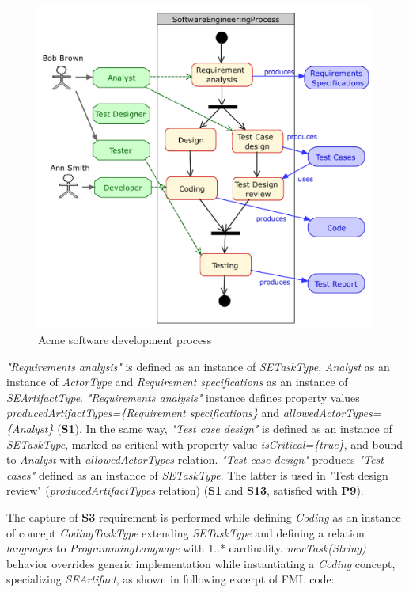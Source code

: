 \begin{figure}
 \centering
    \includegraphics[width=1.0 \columnwidth]{Figures/SoftwareEngineeringProcessCroped.pdf}
     \caption{Acme software development process}
    \label{fig:AcmeSoftwareDevelopmentProcess}
\end{figure}

\textit{"Requirements analysis"} is defined as an instance of \textit{SETaskType}, \textit{Analyst} as an instance of \textit{ActorType} and \textit{Requirement specifications} as an instance of \textit{SEArtifactType}. \textit{"Requirements analysis"} instance defines property values \textit{producedArtifactTypes=\{Requirement specifications\}} and \textit{allowedActorTypes=\{Analyst\}} (\textbf{S1}). In the same way, \textit{"Test case design"} is defined as an instance of \textit{SETaskType}, marked as critical with property value \textit{isCritical=\{true\}}, and bound to \textit{Analyst} with \textit{allowedActorTypes} relation. \textit{"Test case design"} produces \textit{"Test cases"} defined as an instance of \textit{SETaskType}. The latter is used in "Test design review" (\textit{producedArtifactTypes} relation) (\textbf{S1} and \textbf{S13}, satisfied with \textbf{P9}). 

The capture of \textbf{S3} requirement is performed while defining \textit{Coding} as an instance of concept \textit{CodingTaskType} extending \textit{SETaskType} and defining a relation \textit{languages} to \textit{ProgrammingLanguage} with 1..* cardinality. \textit{newTask(String)} behavior overrides generic implementation while instantiating a \textit{Coding} concept, specializing \textit{SEArtifact}, as shown in following excerpt of FML code:

